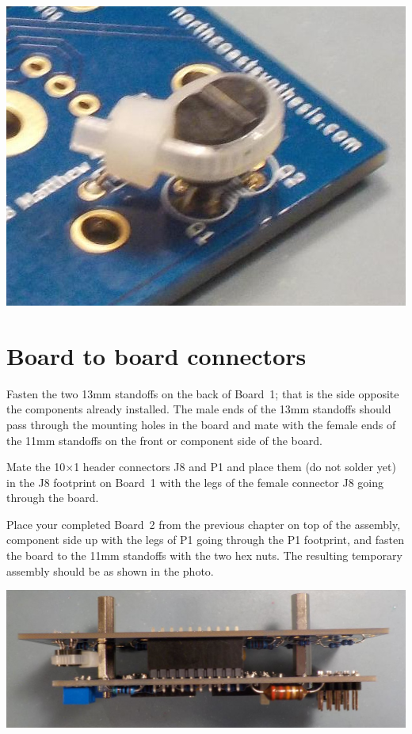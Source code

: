 \nopagebreak
\noindent\includegraphics[width=\linewidth]{expocon2.jpg}

\section{Board to board connectors}

Fasten the two 13mm standoffs on the back of Board~1; that is the side
opposite the components already installed.  The male ends of the 13mm
standoffs should pass through the mounting holes in the board and mate with
the female ends of the 11mm standoffs on the front or component side of the
board.

Mate the 10$\times$1 header connectors J8 and P1 and place them (do not
solder yet) in the J8 footprint on Board~1 with the legs of the female
connector J8 going through the board.

Place your completed Board~2 from the previous chapter on top of the
assembly, component side up with the legs of P1 going through the P1
footprint, and fasten the board to the 11mm standoffs with the two hex nuts. 
The resulting temporary assembly should be as shown in the photo.

\nopagebreak
\noindent\includegraphics[width=\linewidth]{temp-assy.jpg}

